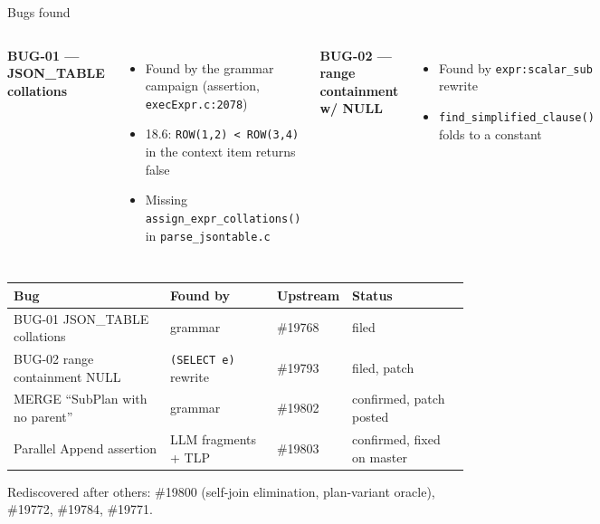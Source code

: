 \documentclass[aspectratio=169,11pt]{beamer}
\begin{document}
\begin{frame}{Bugs found}
\begin{columns}[T]
\textbf{BUG-01 --- JSON\_TABLE collations}
\scriptsize
\begin{itemize}
  \item Found by the grammar campaign (assertion, \texttt{execExpr.c:2078})
  \item 18.6: \texttt{ROW(1,2) < ROW(3,4)} in the context item returns \alert{false}
  \item Missing \texttt{assign\_expr\_collations()} in \texttt{parse\_jsontable.c}
\end{itemize}
\textbf{BUG-02 --- range containment w/ NULL}
\scriptsize
\begin{itemize}
  \item Found by \texttt{expr:scalar\_sub} rewrite
  \item \texttt{find\_simplified\_clause()} folds to a constant
\end{itemize}
\end{columns}
\vspace{-1mm}\scriptsize\setlength{\tabcolsep}{3pt}
\begin{tabular}{llll}
\toprule
Bug & Found by & Upstream & Status \\
\midrule
BUG-01 JSON\_TABLE collations & grammar & \#19768 & filed \\
BUG-02 range containment NULL & \texttt{(SELECT e)} rewrite & \#19793 & filed, patch \\
MERGE ``SubPlan with no parent'' & grammar & \#19802 & \alert{confirmed, patch posted} \\
Parallel Append assertion & LLM fragments + TLP & \#19803 & \alert{confirmed, fixed on master} \\
\bottomrule
\end{tabular}

\scriptsize Rediscovered after others: \#19800 (self-join elimination, plan-variant oracle), \#19772, \#19784, \#19771.
\end{frame}
\end{document}
